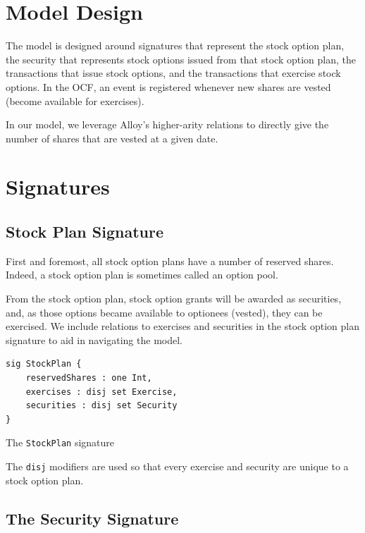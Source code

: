 \section{Model Design}

The model is designed around signatures that represent the stock option plan, the security that represents stock options issued from that stock option plan, the transactions that issue stock options, and the transactions that exercise stock options. In the OCF, an event is registered whenever new shares are vested (become available for exercises). 

In our model, we leverage Alloy's higher-arity relations to directly give the number of shares that are vested at a given date.

\section{Signatures}

\subsection{Stock Plan Signature}

First and foremost, all stock option plans have a number of reserved shares. Indeed, a stock option plan is sometimes called an option pool\cite{investopediaOptionPool}.

From the stock option plan, stock option grants will be awarded as securities, and, as those options became available to optionees (vested), they can be exercised\cite{investopediaExerciseDefinition}. We include relations to exercises and securities in the stock option plan signature to aid in navigating the model.

\begin{listing}[!h]
\begin{verbatim}
sig StockPlan {
    reservedShares : one Int,
    exercises : disj set Exercise,
    securities : disj set Security
}
\end{verbatim}
\caption{The \texttt{StockPlan} signature}
\label{lst:stock-plan-signature-2}
\end{listing}


The \verb|disj| modifiers are used so that every exercise and security are unique to a stock option plan.

\subsection{The Security Signature}

